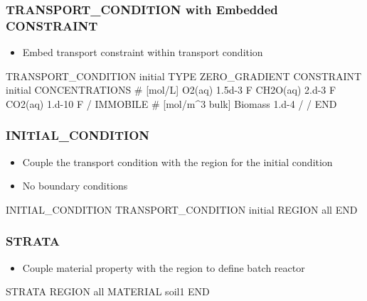 \documentclass{beamer}
\newcommand\redcomment[1]{{{\color{red} #1}}}
\begin{document}
\begin{frame}[fragile]\frametitle{TRANSPORT\_CONDITION {\large with Embedded CONSTRAINT}}

\begin{itemize}
  \item Embed transport constraint within transport condition
\end{itemize}
\begin{semiverbatim}
TRANSPORT_CONDITION initial
  TYPE ZERO_GRADIENT
  \redcomment{CONSTRAINT initial
    CONCENTRATIONS # [mol/L]
      O2(aq)    1.5d-3   F
      CH2O(aq)  2.d-3    F
      CO2(aq)   1.d-10   F
    /
    IMMOBILE    # [mol/m^3 bulk]
      Biomass   1.d-4
    /
  /}
END
\end{semiverbatim}

\end{frame}

\begin{frame}[fragile]\frametitle{INITIAL\_CONDITION}

\begin{itemize}
\item Couple the transport condition with the region for the initial condition
\item No boundary conditions
\end{itemize}

\begin{semiverbatim}

INITIAL_CONDITION
  TRANSPORT_CONDITION initial
  REGION all
END

\end{semiverbatim}

\end{frame}

\begin{frame}[fragile]\frametitle{STRATA}

\begin{itemize}
\item Couple material property with the region to define batch reactor
\end{itemize}

\begin{semiverbatim}

STRATA
  REGION all
  MATERIAL soil1
END


\end{semiverbatim}

\end{frame}
\end{document}
